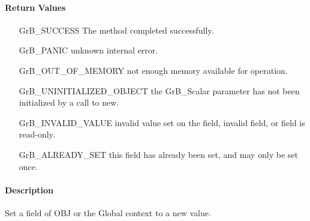 \paragraph{Return Values}

\begin{itemize}[leftmargin=2.1in]
    \item[{\sf GrB\_SUCCESS}]  The method completed successfully.
    \item[{\sf GrB\_PANIC}]             unknown internal error.
    \item[{\sf GrB\_OUT\_OF\_MEMORY}]          not enough memory available for operation.
    \item[{\sf GrB\_UNINITIALIZED\_OBJECT}]          the {\sf GrB\_Scalar} parameter has not been
                                        initialized by a call to {\sf new}.
    \item[{\sf GrB\_INVALID\_VALUE}]    invalid value set on the field, invalid field, or field is read-only.
    \item[{\sf GrB\_ALREADY\_SET}]  this field has already been set, and may only be set once. 
    \end{itemize}

\paragraph{Description}

Set a field of {\sf OBJ} or the Global context to a new value.